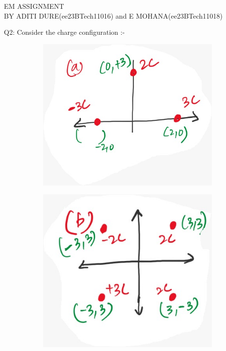 \documentclass[journal,12pt,onecolumn]{IEEEtran}
\theoremstyle{remark}
\begin{document}
\begin{center}
EM ASSIGNMENT \\
BY ADITI DURE(ee23BTech11016) and E MOHANA(ee23BTech11018)
\end{center}

\pagebreak
\pagebreak

Q2: Consider the charge configuration :-

\begin{figure}[h]
  \centering
  \begin{subfigure}{0.3\textwidth}
    \centering
    \includegraphics[width=\linewidth]{q1.jpeg}
  \end{subfigure}
  \begin{subfigure}{0.3\textwidth}
    \centering
    \includegraphics[width=\linewidth]{q2.jpeg}

\end{subfigure}
\end{figure}
\end{document}
